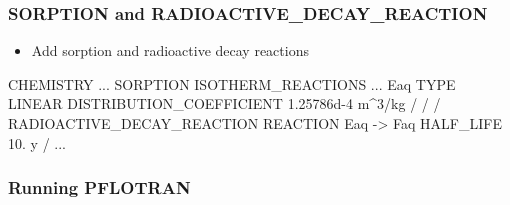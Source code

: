\documentclass{beamer}
\newcommand\magentacomment[1]{{{\color{magenta} #1}}}
\begin{document}
\begin{frame}[fragile]\frametitle{SORPTION and RADIOACTIVE\_DECAY\_REACTION}

\begin{itemize}
  \item Add sorption and radioactive decay reactions
\end{itemize}

\begin{semiverbatim}
CHEMISTRY
  ...
  SORPTION
    ISOTHERM_REACTIONS
      ...
      \magentacomment{Eaq}
        \magentacomment{TYPE LINEAR}
        \magentacomment{DISTRIBUTION_COEFFICIENT 1.25786d-4 m^3/kg}
      \magentacomment{/}
    /
  /
  \magentacomment{RADIOACTIVE_DECAY_REACTION}
    \magentacomment{REACTION Eaq -> Faq}
    \magentacomment{HALF_LIFE 10. y}
  \magentacomment{/}
  ...
\end{semiverbatim}

\end{frame}

\begin{frame}[fragile]\frametitle{Running PFLOTRAN}


\end{frame}
\end{document}
